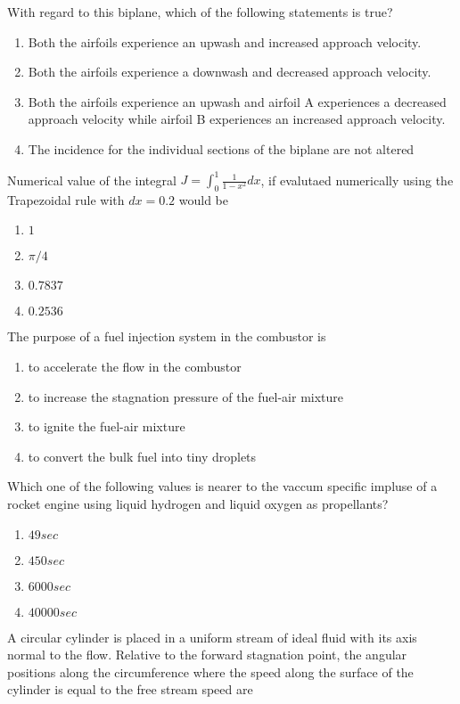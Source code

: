 		With regard to this biplane, which of the following statements is true?
		\begin{enumerate}
			\item Both the airfoils experience an upwash and increased approach velocity.
			\item Both the airfoils experience a downwash and decreased approach velocity.
			\item Both the airfoils experience an upwash and airfoil A experiences a decreased approach velocity while airfoil B experiences an increased approach velocity.
			\item The incidence for the individual sections of the biplane are not altered
		\end{enumerate}
	\item Numerical value of the integral
		$J=\int_0^1\frac{1}{1-x^2}dx$, if evalutaed numerically using the Trapezoidal rule with $dx = 0.2$ would be
		\begin{enumerate}
			\item $1$
			\item $\pi/4$
			\item $0.7837$
			\item $0.2536$
		\end{enumerate}
	\item The purpose of a fuel injection system in the combustor is
		\begin{enumerate}
			\item to accelerate the flow in the combustor
			\item to increase the stagnation pressure of the fuel-air mixture
			\item to ignite the fuel-air mixture
			\item to convert the bulk fuel into tiny droplets
		\end{enumerate}
	\item Which one of the following values is nearer to the vaccum specific impluse of a rocket engine using liquid hydrogen and liquid oxygen as propellants?
		\begin{enumerate}
			\item $49 sec$
			\item $450 sec$
			\item $6000 sec$
			\item $40000 sec$
		\end{enumerate}
	\item A circular cylinder is placed in a uniform stream of ideal fluid with its axis normal to the flow. Relative to the forward stagnation point, the angular positions along the circumference where the speed along the surface of the cylinder is equal to the free stream speed are
